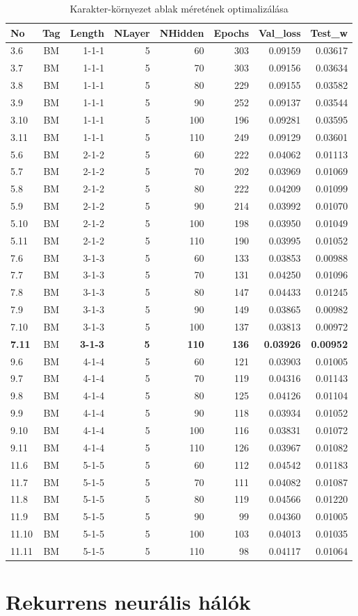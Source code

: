 \documentclass[a4paper, magyar]{article}
\begin{document}
\begin{small}
\begin{table}[tp]\centering
\begin{tabular}{|l|c|r|r|r|r|r|r|}
			\hline
			No&Tag&Length&NLayer&NHidden&Epochs&Val\_loss&Test\_w\\
\hline\hline
3.6&BM&1-1-1&5&60&303&0.09159&0.03617\\
\hline
3.7&BM&1-1-1&5&70&303&0.09156&0.03634\\
\hline
3.8&BM&1-1-1&5&80&229&0.09155&0.03582\\
\hline
3.9&BM&1-1-1&5&90&252&0.09137&0.03544\\
\hline
3.10&BM&1-1-1&5&100&196&0.09281&0.03595\\
\hline
3.11&BM&1-1-1&5&110&249&0.09129&0.03601\\
\hline
5.6&BM&2-1-2&5&60&222&0.04062&0.01113\\
\hline
5.7&BM&2-1-2&5&70&202&0.03969&0.01069\\
\hline
5.8&BM&2-1-2&5&80&222&0.04209&0.01099\\
\hline
5.9&BM&2-1-2&5&90&214&0.03992&0.01070\\
\hline
5.10&BM&2-1-2&5&100&198&0.03950&0.01049\\
\hline
5.11&BM&2-1-2&5&110&190&0.03995&0.01052\\
\hline
7.6&BM&3-1-3&5&60&133&0.03853&0.00988\\
\hline
7.7&BM&3-1-3&5&70&131&0.04250&0.01096\\
\hline
7.8&BM&3-1-3&5&80&147&0.04433&0.01245\\
\hline
7.9&BM&3-1-3&5&90&149&0.03865&0.00982\\
\hline
7.10&BM&3-1-3&5&100&137&0.03813&0.00972\\
\hline
\textbf{7.11}&BM&\textbf{3-1-3}&\textbf{5}&\textbf{110}&\textbf{136}&\textbf{0.03926}&\textbf{0.00952}\\
\hline
9.6&BM&4-1-4&5&60&121&0.03903&0.01005\\
\hline
9.7&BM&4-1-4&5&70&119&0.04316&0.01143\\
\hline
9.8&BM&4-1-4&5&80&125&0.04126&0.01104\\
\hline
9.9&BM&4-1-4&5&90&118&0.03934&0.01052\\
\hline
9.10&BM&4-1-4&5&100&116&0.03831&0.01072\\
\hline
9.11&BM&4-1-4&5&110&126&0.03967&0.01082\\
\hline
11.6&BM&5-1-5&5&60&112&0.04542&0.01183\\
\hline
11.7&BM&5-1-5&5&70&111&0.04082&0.01087\\
\hline
11.8&BM&5-1-5&5&80&119&0.04566&0.01220\\
\hline
11.9&BM&5-1-5&5&90&99&0.04360&0.01005\\
\hline
11.10&BM&5-1-5&5&100&103&0.04013&0.01035\\
\hline
11.11&BM&5-1-5&5&110&98&0.04117&0.01064\\
\hline
\end{tabular}
\caption{Karakter-környezet ablak méretének optimalizálása}
\label{tab:winoptim}
\end{table}
\end{small}
\section{Rekurrens neurális hálók}



\end{document}
